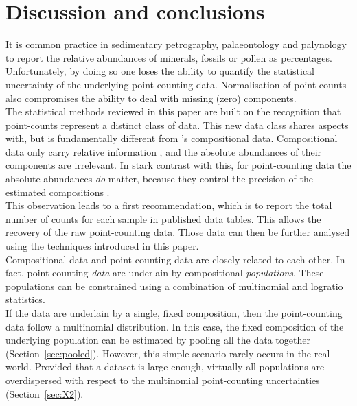 \documentclass{article}
\begin{document}
\section{Discussion and conclusions}
\label{sec:conclusions}

It is common practice in sedimentary petrography, palaeontology and
palynology to report the relative abundances of minerals, fossils or
pollen as percentages. Unfortunately, by doing so one loses the
ability to quantify the statistical uncertainty of the underlying
point-counting data.  Normalisation of point-counts also compromises
the ability to deal with missing (zero) components.\\

The statistical methods reviewed in this paper are built on the
recognition that point-counts represent a distinct class of data.
This new data class shares aspects with, but is fundamentally
different from \citet{aitchison1986}'s compositional
data. Compositional data only carry relative information
\citep{pawlowsky2011}, and the absolute abundances of their components
are irrelevant. In stark contrast with this, for point-counting data
the absolute abundances \emph{do} matter, because they control the
precision of the estimated compositions \citep{bloemsma2015}.\\

This observation leads to a first recommendation, which is to report
the total number of counts for each sample in published data
tables. This allows the recovery of the raw point-counting data. Those
data can then be further analysed using the techniques introduced in
this paper.\\

Compositional data and point-counting data are closely related to each
other.  In fact, point-counting \emph{data} are underlain by
compositional \emph{populations}. These populations can be constrained
using a combination of multinomial and logratio statistics.\\

If the data are underlain by a single, fixed composition, then the
point-counting data follow a multinomial distribution. In this case,
the fixed composition of the underlying population can be estimated by
pooling all the data together (Section~\ref{sec:pooled}). However,
this simple scenario rarely occurs in the real world.  Provided that a
dataset is large enough, virtually all populations are overdispersed
with respect to the multinomial point-counting uncertainties
(Section~\ref{sec:X2}).\\
\end{document}
